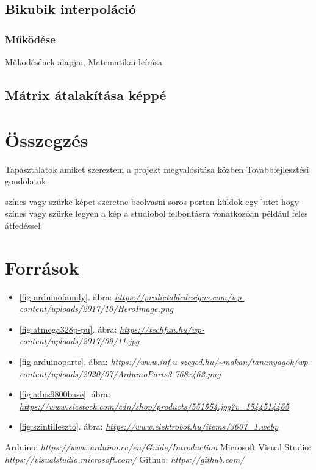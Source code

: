 \documentclass[]{thesis-ekf}
\theoremstyle{definition}
\theoremstyle{remark}
\begin{document}
\section{Bikubik interpoláció}
\subsection{Működése}
Működésének alapjai, Matematikai leírása
\section{Mátrix átalakítása képpé}



\chapter*{Összegzés}
Tapasztalatok amiket szereztem a projekt megvalósítása közben
Tovabbfejlesztési gondolatok

színes vagy szürke képet szeretne beolvasni
soros porton küldok egy bitet hogy színes vagy szürke legyen a kép a studiobol
felbontásra vonatkozóan például  feles átfedéssel 
\chapter*{Források}
\begin{itemize}
	\item \ref{fig-arduinofamily}. ábra: \emph{\url{https://predictabledesigns.com/wp-content/uploads/2017/10/HeroImage.png}}
	\item \ref{fig:atmega328p-pu}. ábra: \emph{\url{https://techfun.hu/wp-content/uploads/2017/09/11.jpg}}
	\item \ref{fig-arduinoparts}. ábra: \emph{\url{https://www.inf.u-szeged.hu/~makan/tananyagok/wp-content/uploads/2020/07/ArduinoParts3-768x462.png}}
	\item \ref{fig:adns9800base}. ábra: \emph{\url{https://www.sicstock.com/cdn/shop/products/551554.jpg?v=1544514465}}
	\item \ref{fig:szintilleszto}. ábra: \emph{\url{https://www.elektrobot.hu/items/3607_1.webp}}
\end{itemize}

\begin{thebibliography}{2}
 Arduino: \emph{https://www.arduino.cc/en/Guide/Introduction}
 Microsoft Visual Studio: \emph{https://visualstudio.microsoft.com/}
 Github: \emph{https://github.com/}
\end{thebibliography}


\end{document}

